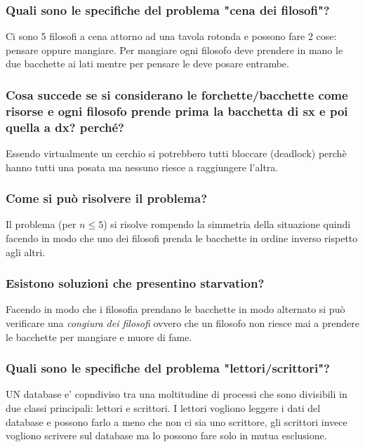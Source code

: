 \documentclass{article}
\begin{document}
\subsubsection{Quali sono le specifiche del problema "cena dei filosofi"?}
Ci sono 5 filosofi a cena attorno ad una tavola rotonda e possono fare 2 cose:
pensare oppure mangiare. Per mangiare ogni filosofo deve prendere in mano le
due bacchette ai lati mentre per pensare le deve posare entrambe.

\subsubsection{Cosa succede se si considerano le forchette/bacchette come risorse
    e ogni filosofo prende prima la bacchetta di sx e poi quella a dx? perché?}
Essendo virtualmente un cerchio si potrebbero tutti bloccare (deadlock) perchè
hanno tutti una posata ma nessuno riesce a raggiungere l'altra.

\subsubsection{Come si può risolvere il problema?}
Il problema (per $n \leq 5$) si risolve rompendo la simmetria della situazione
quindi facendo in modo che uno dei filosofi prenda le bacchette in ordine
inverso rispetto agli altri.

\subsubsection{Esistono soluzioni che presentino starvation?}
Facendo in modo che i filosofia prendano le bacchette in modo alternato si può
verificare una \textit{congiura dei filosofi} ovvero che un filosofo non riesce
mai a prendere le bacchette per mangiare e muore di fame.

\subsubsection{Quali sono le specifiche del problema "lettori/scrittori"?}
UN database e' copndiviso tra una moltitudine di processi che sono divisibili
in due classi principali: lettori e scrittori. I lettori vogliono leggere i
dati del database e possono farlo a meno che non ci sia uno scrittore, gli
scrittori invece vogliono scrivere sul database ma lo possono fare solo in
mutua esclusione.
\end{document}
